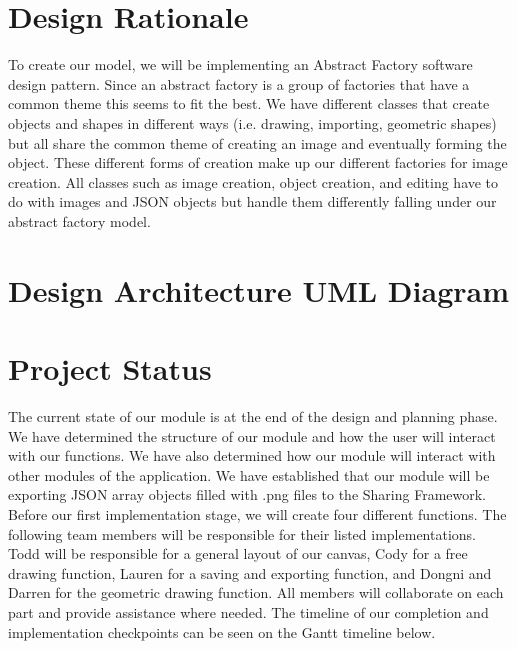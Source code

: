 \documentclass[a4paper, 11pt]{article} %
\begin{document}

\section*{Design Rationale}

To create our model, we will be implementing an Abstract Factory software design pattern. Since an abstract factory is a group of factories that have a common theme this seems to fit the best. We have different classes that create objects and shapes in different ways (i.e. drawing, importing, geometric shapes) but all share the common theme of creating an image and eventually forming the object. These different forms of creation make up our different factories for image creation. All classes such as image creation, object creation, and editing have to do with images and JSON objects but handle them differently falling under our abstract factory model.


\section*{Design Architecture UML Diagram}




\section*{Project Status}

The current state of our module is at the end of the design and planning phase. We have determined the structure of our module and how the user will interact with our functions. We have also determined how our module will interact with other modules of the application. We have established that our module will be exporting JSON array objects filled with .png files to the Sharing Framework. Before our first implementation stage, we will create four different functions. The following team members will be responsible for their listed implementations. Todd will be responsible for a general layout of our canvas, Cody for a free drawing function, Lauren for a saving and exporting function, and Dongni and Darren for the geometric drawing function. All members will collaborate on each part and provide assistance where needed. The timeline of our completion and implementation checkpoints can be seen on the Gantt timeline below.
\end{document}
